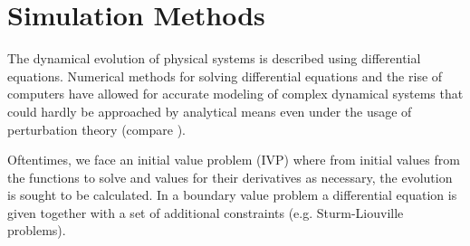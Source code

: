 \pagebreak
\part{Simulation Methods}
\thispagestyle{plain}
The dynamical evolution of physical systems is described using differential equations. 
Numerical methods for solving differential equations and 
the rise of computers have allowed for accurate modeling 
of complex dynamical systems that could hardly be approached 
by analytical means even under the usage of perturbation 
theory (compare \cite{Moser1978}).

Oftentimes, we face an initial value problem (IVP) where from 
initial values from the functions to solve and values for their 
derivatives as necessary, the evolution is sought to be calculated. 
In a boundary value problem a differential equation is given together 
with a set of additional constraints (e.g. Sturm-Liouville problems).